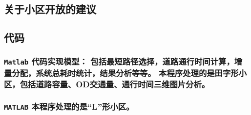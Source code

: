 \singlespace
\subsection{关于小区开放的建议}

\newpage
\subsection{代码}
\subsubsection{\texttt{Matlab} 代码实现模型：
包括最短路径选择，道路通行时间计算，增量分配，系统总耗时统计，结果分析等等。
本程序处理的是田字形小区，包括道路容量、OD交通量、通行时间三维图片分析。
\label{sec:pythonselectschool}}



\subsubsection{\texttt{MATLAB} 
本程序处理的是“L”形小区。\label{secmatlabpcacodes}}



%
